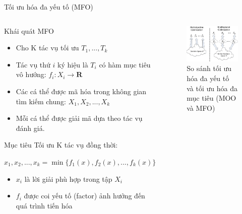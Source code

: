 	\begin{frame}{Tối ưu hóa đa yếu tố (MFO)}
	    \begin{columns}
		\begin{itemize}
	    	\begin{block}{Khái quát MFO}
        		\begin{itemize}
                \item Cho K tác vụ tối ưu $T_1, ..., T_k$
                \item Tác vụ thứ $i$ ký hiệu là $T_i$ có hàm mục tiêu vô hướng: $f_i: X_i \rightarrow \mathbf{R}$
                \item Các cá thể được mã hóa trong không gian tìm kiếm chung: $X_1, X_2, ..., X_k$
                \item Mỗi cá thể được giải mã dựa theo tác vụ đánh giá.
                \end{itemize}
			\end{block}
			\begin{block}{Mục tiêu}
			    Tối ưu K tác vụ đồng thời:
			    \begin{center}
                    \centering
                    ${x_1, x_2, ..., x_k} = \min \{f_1(x), f_2(x), ..., f_k(x)\}$
                \end{center}
        		\begin{itemize}
                \item $x_i$ là lời giải phù hợp trong tập $X_i$
                \item $f_i$ được coi yếu tố (factor) ảnh hưởng đến quá trình tiến hóa
                \end{itemize}
			\end{block}
		\end{itemize}
		\begin{figure}
            \centering
                \includegraphics[width=1.0\textwidth]{images/mfo.png}
            \caption{So sánh tối ưu hóa đa yếu tố và tối ưu hóa đa mục tiêu (MOO và MFO)}
            \label{fig:mfo}
        \end{figure}
		\end{columns}
	\end{frame}
	
